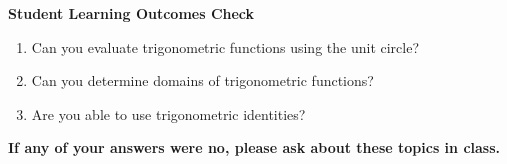 \noindent \textbf{Student Learning Outcomes Check}

\begin{enumerate}
\item Can you evaluate trigonometric functions using the unit circle?
\item Can you determine domains of trigonometric functions?
\item Are you able to use trigonometric identities?

\end{enumerate}

\noindent \textbf{If any of your answers were no, please ask about these topics in class.}


